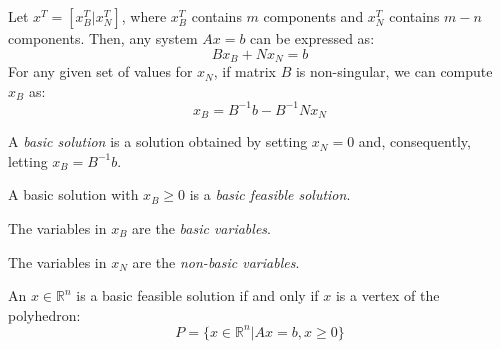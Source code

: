 Let $x^T=\left[x_B^T | x_N^T\right]$, where $x_B^T$ contains  $m$ components and $x_N^T$ contains  $m-n$ components. 
Then, any system $Ax = b$ can be expressed as:
\[Bx_B+Nx_N=b\]
For any given set of values for $x_N$, if matrix  $B$ is non-singular, we can compute $x_B$ as:
\[x_B=B^{-1}b-B^{-1}Nx_N\]
\begin{definition}
    A \emph{basic solution} is a solution obtained by setting $x_N=0$ and, consequently, letting $x_B=B^{-1}b$.

    A basic solution with $x_B \geq 0$ is a \emph{basic feasible solution}.

    The variables in $x_B$ are the \emph{basic variables}.
    
    The variables in $x_N$ are the \emph{non-basic variables}.
\end{definition}
\begin{theorem}
    An $x \in \mathbb{R}^n$ is a basic feasible solution if and only if $x$ is a vertex of the polyhedron:
    \[P=\{x \in \mathbb{R}^n|Ax=b,x \geq 0\}\]
\end{theorem}
